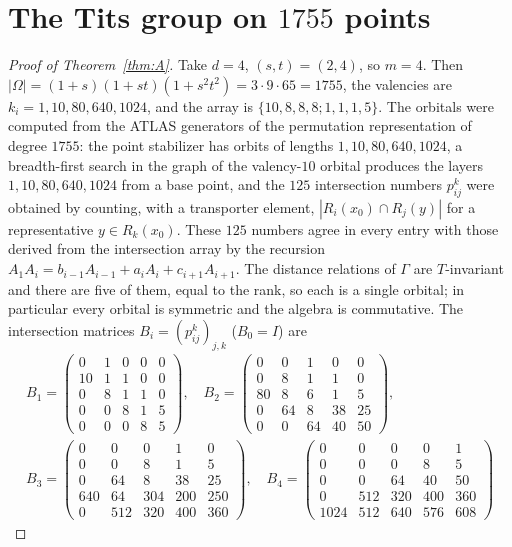 \documentclass[11pt]{article}
\theoremstyle{remark}
\begin{document}
\section{The Tits group on $1755$ points}

\begin{proof}[Proof of Theorem~\ref{thm:A}]
Take $d=4$, $(s,t)=(2,4)$, so $m=4$. Then $|\Omega|=(1+s)(1+st)(1+s^2t^2)=3\cdot9\cdot65=1755$, the valencies are $k_i=1,10,80,640,1024$, and the array is $\{10,8,8,8;1,1,1,5\}$. The orbitals were computed from the ATLAS generators of the permutation representation of degree $1755$: the point stabilizer has orbits of lengths $1,10,80,640,1024$, a breadth-first search in the graph of the valency-$10$ orbital produces the layers $1,10,80,640,1024$ from a base point, and the $125$ intersection numbers $p_{ij}^k$ were obtained by counting, with a transporter element, $|R_i(x_0)\cap R_j(y)|$ for a representative $y\in R_k(x_0)$. These $125$ numbers agree in every entry with those derived from the intersection array by the recursion $A_1A_i=b_{i-1}A_{i-1}+a_iA_i+c_{i+1}A_{i+1}$. The distance relations of $\Gamma$ are $T$-invariant and there are five of them, equal to the rank, so each is a single orbital; in particular every orbital is symmetric and the algebra is commutative. The intersection matrices $B_i=(p_{ij}^k)_{j,k}$ ($B_0=I$) are
\begin{equation}\label{eq:B}
\begin{gathered}
B_1=\begin{pmatrix}0 & 1 & 0 & 0 & 0 \\ 10 & 1 & 1 & 0 & 0 \\ 0 & 8 & 1 & 1 & 0 \\ 0 & 0 & 8 & 1 & 5 \\ 0 & 0 & 0 & 8 & 5\end{pmatrix},\quad B_2=\begin{pmatrix}0 & 0 & 1 & 0 & 0 \\ 0 & 8 & 1 & 1 & 0 \\ 80 & 8 & 6 & 1 & 5 \\ 0 & 64 & 8 & 38 & 25 \\ 0 & 0 & 64 & 40 & 50\end{pmatrix} ,\\[6pt]
B_3=\begin{pmatrix}0 & 0 & 0 & 1 & 0 \\ 0 & 0 & 8 & 1 & 5 \\ 0 & 64 & 8 & 38 & 25 \\ 640 & 64 & 304 & 200 & 250 \\ 0 & 512 & 320 & 400 & 360\end{pmatrix},\quad B_4=\begin{pmatrix}0 & 0 & 0 & 0 & 1 \\ 0 & 0 & 0 & 8 & 5 \\ 0 & 0 & 64 & 40 & 50 \\ 0 & 512 & 320 & 400 & 360 \\ 1024 & 512 & 640 & 576 & 608\end{pmatrix}

\end{gathered}
\end{equation}
\end{proof}
\end{document}
